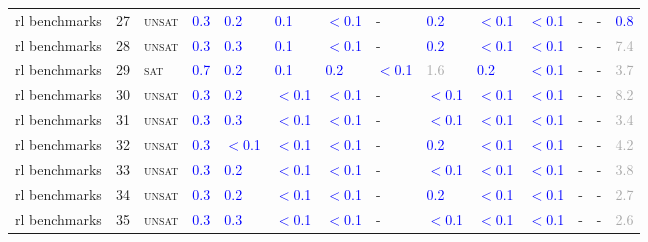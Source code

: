 \begin{center}
{\begin{longtable}{@{}llllllllllllll@{}}
rl benchmarks & 27 & \textsc{unsat} & \textcolor{blue}{0.3} & \textcolor{blue}{0.2} & \textcolor{blue}{0.1} & \textcolor{blue}{$<$0.1} & - & \textcolor{blue}{0.2} & \textcolor{blue}{$<$0.1} & \textcolor{blue}{$<$0.1} & - & - & \textcolor{blue}{0.8} \\
rl benchmarks & 28 & \textsc{unsat} & \textcolor{blue}{0.3} & \textcolor{blue}{0.3} & \textcolor{blue}{0.1} & \textcolor{blue}{$<$0.1} & - & \textcolor{blue}{0.2} & \textcolor{blue}{$<$0.1} & \textcolor{blue}{$<$0.1} & - & - & \textcolor{darkgray}{7.4} \\
rl benchmarks & 29 & \textsc{sat} & \textcolor{blue}{0.7} & \textcolor{blue}{0.2} & \textcolor{blue}{0.1} & \textcolor{blue}{0.2} & \textcolor{blue}{$<$0.1} & \textcolor{darkgray}{1.6} & \textcolor{blue}{0.2} & \textcolor{blue}{$<$0.1} & - & - & \textcolor{darkgray}{3.7} \\
rl benchmarks & 30 & \textsc{unsat} & \textcolor{blue}{0.3} & \textcolor{blue}{0.2} & \textcolor{blue}{$<$0.1} & \textcolor{blue}{$<$0.1} & - & \textcolor{blue}{$<$0.1} & \textcolor{blue}{$<$0.1} & \textcolor{blue}{$<$0.1} & - & - & \textcolor{darkgray}{8.2} \\
rl benchmarks & 31 & \textsc{unsat} & \textcolor{blue}{0.3} & \textcolor{blue}{0.3} & \textcolor{blue}{$<$0.1} & \textcolor{blue}{$<$0.1} & - & \textcolor{blue}{$<$0.1} & \textcolor{blue}{$<$0.1} & \textcolor{blue}{$<$0.1} & - & - & \textcolor{darkgray}{3.4} \\
rl benchmarks & 32 & \textsc{unsat} & \textcolor{blue}{0.3} & \textcolor{blue}{$<$0.1} & \textcolor{blue}{$<$0.1} & \textcolor{blue}{$<$0.1} & - & \textcolor{blue}{0.2} & \textcolor{blue}{$<$0.1} & \textcolor{blue}{$<$0.1} & - & - & \textcolor{darkgray}{4.2} \\
rl benchmarks & 33 & \textsc{unsat} & \textcolor{blue}{0.3} & \textcolor{blue}{0.2} & \textcolor{blue}{$<$0.1} & \textcolor{blue}{$<$0.1} & - & \textcolor{blue}{$<$0.1} & \textcolor{blue}{$<$0.1} & \textcolor{blue}{$<$0.1} & - & - & \textcolor{darkgray}{3.8} \\
rl benchmarks & 34 & \textsc{unsat} & \textcolor{blue}{0.3} & \textcolor{blue}{0.2} & \textcolor{blue}{$<$0.1} & \textcolor{blue}{$<$0.1} & - & \textcolor{blue}{0.2} & \textcolor{blue}{$<$0.1} & \textcolor{blue}{$<$0.1} & - & - & \textcolor{darkgray}{2.7} \\
rl benchmarks & 35 & \textsc{unsat} & \textcolor{blue}{0.3} & \textcolor{blue}{0.3} & \textcolor{blue}{$<$0.1} & \textcolor{blue}{$<$0.1} & - & \textcolor{blue}{$<$0.1} & \textcolor{blue}{$<$0.1} & \textcolor{blue}{$<$0.1} & - & - & \textcolor{darkgray}{2.6} \\

\end{longtable}}
\end{center}
